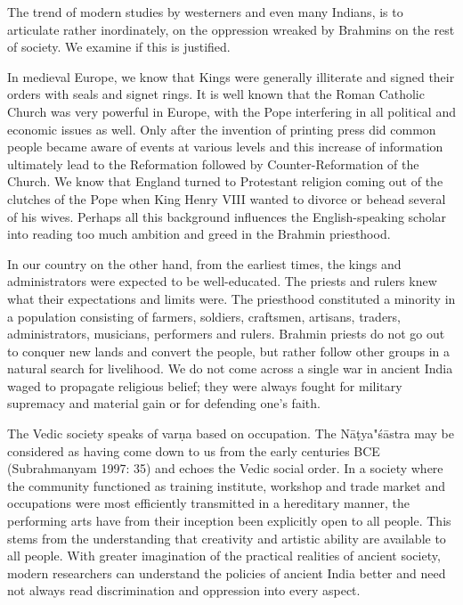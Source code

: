 The trend of modern studies by westerners and even many Indians, is to articulate rather inordinately, on the oppression wreaked by Brahmins on the rest of society. We examine if this is justified.

\vskip 2pt

In medieval Europe, we know that Kings were generally illiterate and signed their orders with seals and signet rings. It is well known that the Roman Catholic Church was very powerful in Europe, with the Pope interfering in all political and economic issues as well. Only after the invention of printing press did common people became aware of events at various levels and this increase of information ultimately lead to the Reformation followed by Counter-Reformation of the Church. We know that England turned to Protestant religion coming out of the clutches of the Pope when King Henry VIII wanted to divorce or behead several of his wives. Perhaps all this background influences the English-speaking scholar into reading too much ambition and greed in the Brahmin priesthood.

\vskip 2pt

In our country on the other hand, from the earliest times, the kings and administrators were expected to be well-educated. The priests and rulers knew what their expectations and limits were. The priesthood constituted a minority in a population consisting of farmers, soldiers, craftsmen, artisans, traders, administrators, musicians, performers and rulers. Brahmin priests do not go out to conquer new lands and convert the people, but rather follow other groups in a natural search for livelihood. We do not come across a single war in ancient India waged to propagate religious belief; they were always fought for military supremacy and material gain or for defending one’s faith.

The Vedic society speaks of varṇa based on occupation. The Nāṭya"śāstra may be considered as having come down to us from the early centuries BCE (Subrahmanyam 1997: 35) and echoes the Vedic social order. In a society where the community functioned as training institute, workshop and trade market and occupations were most efficiently transmitted in a hereditary manner, the performing arts have from their inception been explicitly open to all people. This stems from the understanding that creativity and artistic ability are available to all people. With greater imagination of the practical realities of ancient society, modern researchers can understand the policies of ancient India better and need not always read discrimination and oppression into every aspect.

